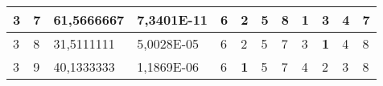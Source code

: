 \documentclass[conference]{IEEEtran}
\begin{document}
\begin{table*}[]
\begin{tabular}{|llll|llllllll|}
\multicolumn{1}{|l|}{3}                                                     & \multicolumn{1}{l|}{7}                                                        & \multicolumn{1}{l|}{61,5666667}                                                   & 7,3401E-11                     & \multicolumn{1}{l|}{6}                                                  & \multicolumn{1}{l|}{2}                                                  & \multicolumn{1}{l|}{5}                                                  & \multicolumn{1}{l|}{8}                                                  & \multicolumn{1}{l|}{\textbf{1}}                                         & \multicolumn{1}{l|}{3}                                                  & \multicolumn{1}{l|}{4}                                                  & 7                          \\ \hline
\multicolumn{1}{|l|}{3}                                                     & \multicolumn{1}{l|}{8}                                                        & \multicolumn{1}{l|}{31,5111111}                                                   & 5,0028E-05                     & \multicolumn{1}{l|}{6}                                                  & \multicolumn{1}{l|}{2}                                                  & \multicolumn{1}{l|}{5}                                                  & \multicolumn{1}{l|}{7}                                                  & \multicolumn{1}{l|}{3}                                                  & \multicolumn{1}{l|}{\textbf{1}}                                         & \multicolumn{1}{l|}{4}                                                  & 8                          \\ \hline
\multicolumn{1}{|l|}{3}                                                     & \multicolumn{1}{l|}{9}                                                        & \multicolumn{1}{l|}{40,1333333}                                                   & 1,1869E-06                     & \multicolumn{1}{l|}{6}                                                  & \multicolumn{1}{l|}{\textbf{1}}                                         & \multicolumn{1}{l|}{5}                                                  & \multicolumn{1}{l|}{7}                                                  & \multicolumn{1}{l|}{4}                                                  & \multicolumn{1}{l|}{2}                                                  & \multicolumn{1}{l|}{3}                                                  & 8                          \\ \hline

\end{tabular}
\end{table*}
\end{document}
